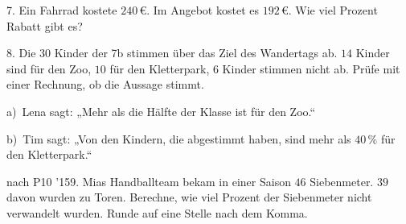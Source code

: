 \documentclass[11pt]{article}
\begin{document}
\begin{pfaufg}{}{7.}{}
Ein Fahrrad kostete $240\,€$. Im Angebot kostet es $192\,€$. Wie viel Prozent Rabatt gibt es?\par
{}
\end{pfaufg}

\begin{pfaufg}{}{8.}{}
Die $30$ Kinder der 7b stimmen über das Ziel des Wandertags ab. $14$ Kinder sind für den Zoo, $10$ für den Kletterpark, $6$ Kinder stimmen nicht ab. Prüfe mit einer Rechnung, ob die Aussage stimmt.\par\smallskip
\noindent\begin{minipage}[t]{0.48\linewidth}
a)\ Lena sagt: „Mehr als die Hälfte der Klasse ist für den Zoo.“
\end{minipage}\hfill
\begin{minipage}[t]{0.48\linewidth}
b)\ Tim sagt: „Von den Kindern, die abgestimmt haben, sind mehr als $40\,\%$ für den Kletterpark.“
\end{minipage}
\end{pfaufg}

\begin{pfaufg}{nach P10 ’15}{9.}{}
Mias Handballteam bekam in einer Saison $46$ Siebenmeter. $39$ davon wurden zu Toren. Berechne, wie viel Prozent der Siebenmeter nicht verwandelt wurden. Runde auf eine Stelle nach dem Komma.\par
{}
\end{pfaufg}

\par\vfill{}
\end{document}
